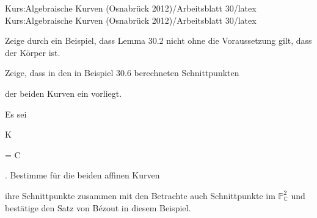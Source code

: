 Kurs:Algebraische Kurven (Osnabrück 2012)/Arbeitsblatt 30/latex
Kurs:Algebraische Kurven (Osnabrück 2012)/Arbeitsblatt 30/latex


\setcounter{section}{30}





{}

{


Zeige durch ein Beispiel, dass Lemma 30.2
nicht ohne die Voraussetzung gilt, dass der Körper
 ist.


}

{} {}



{}

{


Zeige, dass in den in
Beispiel 30.6
berechneten Schnittpunkten

 der beiden Kurven ein
 vorliegt.


}

{} {}



{}

{


Es sei


\mavergleichskette

{\vergleichskette

{ K
}

{ = }{ {\mathbb C}
}

{  }{
}

{    }{
}

{   }{
}

}
{}{}{.}
Bestimme für die beiden affinen Kurven


 {  }


ihre Schnittpunkte zusammen mit den
Betrachte auch Schnittpunkte im ${\mathbb P}^{2}_{ {\mathbb C}}$ und bestätige
den Satz von Bézout
in diesem Beispiel.


}

{} {}



{}

